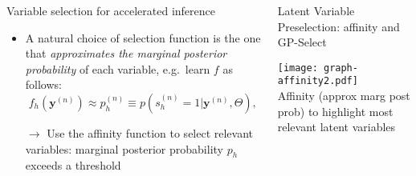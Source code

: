 \documentclass[final]{beamer}
\renewcommand{\vec}[1]{{\mathbf{#1}}}
\newcommand{\highlight}[1]{\textcolor{blocktbgn}{#1}}
\renewcommand{\vec}[1]{{\mathbf{#1}}}
\begin{document}
\begin{frame}{}
\begin{columns}[t]
\begin{column}{.33\linewidth}
\begin{block}{Variable selection for accelerated inference}
\begin{itemize}
            \item A natural choice of \highlight{selection function} is the one that \highlight{\emph{approximates the marginal posterior probability}}
                of each variable, e.g.\ learn \highlight{$f$} as follows:
                \begin{equation}
                \label{eq:affinity}
                f_h(\vec{y}^{(n)}) %
                    \approx p^{(n)}_h \equiv p(s^{(n)}_h = 1|\vec{y}^{(n)}, \Theta),
                \end{equation}

        \highlight{$\rightarrow$} Use the affinity function to \highlight{select relevant variables}: marginal posterior probability \highlight{$p_h$ exceeds a threshold}
         \end{itemize}
    \vspace{-.7cm}
    \end{block}

  \end{column}
  \begin{column}{.35\linewidth}

    \begin{block}{Latent Variable Preselection: affinity and GP-Select}
          \vspace{-.4cm}
            \begin{center} 
 
            \vspace{.1cm}
            \texttt{[image: graph-affinity2.pdf]}\\
           \textcolor{blocktbgn}{Affinity (approx marg post prob) to highlight most relevant latent variables}
            \end{center}
       
        
          \vspace{-.2cm}
           \begin{itemize}
            \setlength{\labelsep}{0.5em}


\end{itemize}
\end{block}
\end{column}
\end{columns}
\end{frame}
\end{document}
